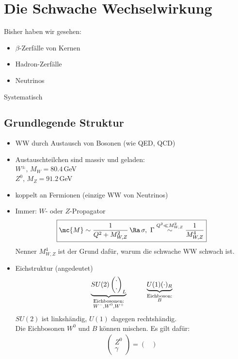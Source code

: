 
\chapter{Die Schwache Wechselwirkung}
Bisher haben wir gesehen:
\begin{itemize}
\item $\beta$-Zerfälle von Kernen
\item Hadron-Zerfälle
\item Neutrinos
\end{itemize}
Systematisch
\section{Grundlegende Struktur}
\begin{itemize}
\item WW durch Austausch von Bosonen (wie QED, QCD)
\item Austauschteilchen sind massiv und geladen:\\
$W^\pm$, $M_W = 80.4\,$GeV\\
$Z^0$, $M_Z = 91.2$\,GeV
\item koppelt an  Fermionen (einzige WW von Neutrinos)
\item Immer: $W$- oder $Z$-Propagator
\begin{align}
\boxed{\mc{M} \sim \frac{1}{Q^2 + M_{W,Z}^2} \, \Ra \, \sigma,\ \Gamma \overset{Q^2 \ll M_{W,Z}^2}{\sim} \frac{1}{M_{W,Z}^4}}
\end{align}
Nenner $M_{W,Z}^4$ ist der Grund dafür, warum die schwache WW schwach ist.
\item Eichstruktur (angedeutet)
\begin{align}
\underbrace{SU(2)\begin{pmatrix}\cdot\\ \cdot\end{pmatrix}_L}_{\substack{\text{Eichbosonen:}\\W^-, W^0, W^+}} \hspace*{1cm} \underbrace{U(1) (\cdot)_R}_{\substack{\text{Eichboson:}\\B}}
\end{align}
$SU(2)$ ist linkshändig, $U(1)$ dagegen rechtshändig.\\
Die Eichbosonen $W^0$ und $B$ können mischen. Es gilt dafür:
\begin{align}
\begin{pmatrix}
Z^0 \\ \gamma
\end{pmatrix} = \begin{pmatrix}

\end{pmatrix}
\end{align}
\end{itemize}
